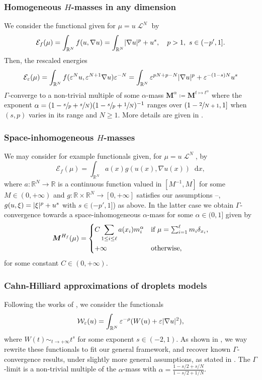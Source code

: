 \documentclass[JEP,XML,SOM,Unicode,published]{cedram}
\theoremstyle{plain}
\theoremstyle{definition}
\newcommand{\dd}{\mathop{}\mathopen{}\mathrm{d}}
\newcommand{\R}{\mathbb{R}}
\newcommand{\ener}{\mathcal{E}}
\newcommand{\mass}{\boldsymbol{M}}
\newcommand{\eps}{\varepsilon}
\DeclarePairedDelimiter{\abs}{\lvert}{\rvert}
\DeclareMathOperator{\lbm}{\mathcal{L}}
\begin{document}
\subsubsection*{Homogeneous \(H\)-masses in any dimension} We consider the functional given for $\mu = u \lbm^N$ by
\begin{equation}
\ener_{f}(\mu) = \int_{\R^N} f(u,\nabla u) = \int_{\R^N} \abs{\nabla u}^p + u^s,\quad p>1,\ s\in (-p',1].
\end{equation}
Then, the rescaled energies
\[\ener_\eps(\mu) = \int_{\R^N} f(\eps^N u,\eps^{N+1}\nabla u) \eps^{-N}= \int_{\R^N} \eps^{pN+p-N}\abs{\nabla u}^p+\eps^{-(1-s)N}u^s\]
$\Gamma$-converge to a non-trivial multiple of some $\alpha$-mass $\mass^\alpha \coloneqq \mass^{t\mapsto t^\alpha}$ where the exponent $\alpha = (1 -\sfrac sp + \sfrac sN)(1 -\sfrac sp + \sfrac 1N)^{-1}$ ranges over $(1-\sfrac{2}{N+1},1]$ when $(s,p)$ varies in its range and $N\geq 1$. More details are given in .

\subsubsection*{Space-inhomogeneous $H$-masses} We may consider for example functionals given, for $\mu = u\lbm^N$, by
\[\ener_f(\mu) = \int_{\R^N} a(x) g(u(x),\nabla u(x)) \dd x,\]
where $a : \R^N \to \R$ is a continuous function valued in $[M^{-1}, M]$ for some $M\in (0,+\infty)$ and $g : \R \times \R^N \to [0,+\infty]$ satisfies our assumptions --, \eg $g(u,\xi) = \abs{\xi}^p+ u^s$ with $s\in (-p',1]$) as above. In the latter case we obtain $\Gamma$-convergence towards a space-inhomogeneous $\alpha$-mass for some $\alpha \in (0,1]$ given by
\[\mass^{H_f}(\mu) = 
\begin{dcases*}
C \sum_{1\leq i\leq \ell} a(x_i) m_i^\alpha& if $\mu = \sum_{i=1}^\ell m_i \delta_{x_i}$,\\
+\infty & otherwise,
\end{dcases*}
\]
for some constant $C\in (0,+\infty)$.

\subsubsection*{Cahn-Hilliard approximations of droplets models} Following the works of \cite{bouchitteTransitionsPhasesAvec1996,dubsProblemesPerturbationsSingulieres1998}, we consider the functionals
\begin{equation}
\mathcal W_\eps(u) =
\int_{\R^N} \eps^{-\rho} (W(u) + \eps\abs{\nabla u}^2),
\end{equation}
where $W(t) \sim_{t\to+\infty} t^s$ for some exponent $s\in (-2,1)$. As shown in , we way rewrite these functionals to fit our general framework, and recover known $\Gamma$-convergence results, under slightly more general assumptions, as stated in . The $\Gamma$-limit is a non-trivial multiple of the $\alpha$-mass with $\alpha = \frac{1-s/2+s/N}{1-s/2+1/N}$.
\end{document}
